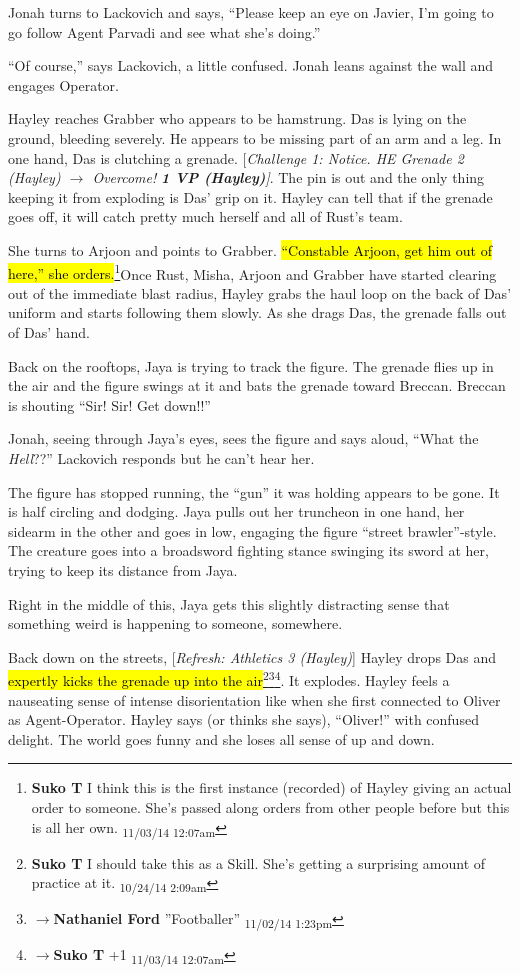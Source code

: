 Jonah turns to Lackovich and says, ``Please keep an eye on Javier, I'm going to go follow Agent Parvadi and see what she's doing.''

``Of course,'' says Lackovich, a little confused.   Jonah leans against the wall and engages Operator.



Hayley reaches Grabber who appears to be hamstrung.  Das is lying on the ground, bleeding severely.  He appears to be missing part of an arm and a leg.  In one hand, Das is clutching a grenade.  {[}\textit{Challenge 1: Notice.  HE Grenade 2 (Hayley) $\rightarrow$ Overcome! }\textit{\textbf{1 VP (Hayley)}}\textit{{]}}.  The pin is out and the only thing keeping it from exploding is Das' grip on it.  Hayley can tell that if the grenade goes off, it will catch pretty much herself and all of Rust's team.

She turns to Arjoon and points to Grabber.  \hl{``Constable Arjoon, get him out of here,'' she orders.}\footnote{\textbf{Suko T }I think this is the first instance (recorded) of Hayley giving an actual order to someone.  She's passed along orders from other people before but this is all her own. \textsubscript{11/03/14 12:07am}}Once Rust, Misha, Arjoon and Grabber have started clearing out of the immediate blast radius, Hayley grabs the haul loop on the back of Das' uniform and starts following them slowly.  As she drags Das, the grenade falls out of Das' hand. 



Back on the rooftops, Jaya is trying to track the figure.  The grenade flies up in the air and the figure swings at it and bats the grenade toward Breccan.  Breccan is shouting ``Sir!  Sir!  Get down!!''

Jonah, seeing through Jaya's eyes, sees the figure and says aloud, ``What the \textit{Hell}??''  Lackovich responds but he can't hear her.

The figure has stopped running, the ``gun'' it was holding appears to be gone.  It is half circling and dodging.  Jaya pulls out her truncheon in one hand, her sidearm in the other and goes in low, engaging the figure ``street brawler''-style.  The creature goes into a broadsword fighting stance swinging its sword at her, trying to keep its distance from Jaya.

Right in the middle of this, Jaya gets this slightly distracting sense that something weird is happening to someone, somewhere.



Back down on the streets, {[}\textit{Refresh: Athletics 3 (Hayley)}{]} Hayley drops Das and \hl{expertly kicks the grenade up into the air}\footnote{\textbf{Suko T }I should take this as a Skill.  She's getting a surprising amount of practice at it. \textsubscript{10/24/14 2:09am}}\footnote{$\rightarrow$\textbf{Nathaniel Ford }''Footballer'' \textsubscript{11/02/14 1:23pm}}\footnote{$\rightarrow$\textbf{Suko T }+1 \textsubscript{11/03/14 12:07am}}.  It explodes.  Hayley feels a nauseating sense of intense disorientation like when she first connected to Oliver as Agent-Operator.  Hayley says (or thinks she says), ``Oliver!'' with confused delight.  The world goes funny and she loses all sense of up and down.  


